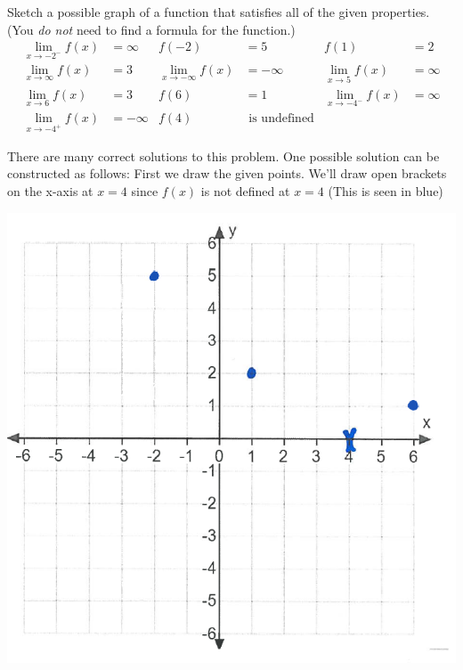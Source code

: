 \documentclass[nooutcomes]{ximera}
\begin{document}
\begin{problem}
 Sketch a possible graph of a function that satisfies all of the given properties.
  (You \emph{do not} need to find a formula for the function.)
  \begin{align*}
 	\lim_{x \to -2^-} f(x) &= \infty &   f(-2) &= 5 &  f(1) &= 2 \\
	 \lim_{x \to \infty} f(x) &= 3 & \lim_{x \to -\infty} f(x) &= -\infty & \lim_{x \to 5} f(x) &= \infty \\
	 \lim_{x \to 6} f(x) &= 3 & f(6) &=  1 & \lim_{x \to -4^-} f(x) &= \infty \\
	 \lim_{x \to -4^+} f(x) &= -\infty & f(4) &\text{ is undefined} 
  \end{align*}
  \begin{freeResponse}
      There are many correct solutions to this problem.
  One possible solution can be constructed as follows:
	First we draw the given points.  We'll draw open brackets on the x-axis at $x=4$ since $f(x)$ is not defined at $x=4$ (This is seen in blue)
	\begin{image}
   	 \includegraphics[scale = 0.4]{Figure10.png}   
	\end{image} 


\end{freeResponse}
\end{problem}
\end{document}
